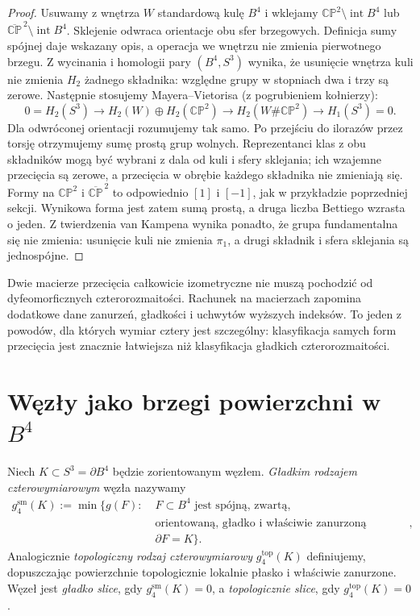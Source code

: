 \begin{proof}
Usuwamy z wnętrza $W$ standardową kulę $B^4$ i wklejamy
$\mathbb{CP}^2\setminus\operatorname{int}B^4$ lub
$\overline{\mathbb{CP}}^{\,2}\setminus\operatorname{int}B^4$.
Sklejenie odwraca orientacje obu sfer brzegowych.
Definicja sumy spójnej daje wskazany opis,
a operacja we wnętrzu nie zmienia pierwotnego brzegu.
Z wycinania i homologii pary $(B^4,S^3)$ wynika,
że usunięcie wnętrza kuli nie zmienia $H_2$
żadnego składnika: względne grupy w stopniach
dwa i trzy są zerowe. Następnie stosujemy
Mayera--Vietorisa (z pogrubieniem kołnierzy):
\[
0=H_2(S^3)\to H_2(W)\oplus H_2(\mathbb{CP}^2)
\to H_2(W\#\mathbb{CP}^2)\to H_1(S^3)=0.
\]
Dla odwróconej orientacji rozumujemy tak samo.
Po przejściu do ilorazów przez torsję otrzymujemy
sumę prostą grup wolnych. Reprezentanci klas
z obu składników mogą być wybrani z dala
od kuli i sfery sklejania; ich wzajemne
przecięcia są zerowe, a przecięcia w obrębie
każdego składnika nie zmieniają się. Formy
na $\mathbb{CP}^2$ i $\overline{\mathbb{CP}}^{\,2}$
to odpowiednio $[1]$ i $[-1]$, jak w przykładzie
poprzedniej sekcji. Wynikowa forma jest zatem
sumą prostą, a druga liczba Bettiego wzrasta
o jeden. Z twierdzenia van Kampena wynika
ponadto, że grupa fundamentalna się nie zmienia:
usunięcie kuli nie zmienia $\pi_1$, a drugi
składnik i sfera sklejania są jednospójne.
\end{proof}

\begin{uwaga}
Dwie macierze przecięcia całkowicie izometryczne nie muszą
pochodzić od dyfeomorficznych czterorozmaitości.
Rachunek na macierzach zapomina dodatkowe dane zanurzeń,
gładkości i uchwytów wyższych indeksów. To jeden z powodów,
dla których wymiar cztery jest szczególny: klasyfikacja
samych form przecięcia jest znacznie łatwiejsza niż
klasyfikacja gładkich czterorozmaitości.
\end{uwaga}

\section{Węzły jako brzegi powierzchni w \texorpdfstring{$B^4$}{B4}}
\label{sec:kt-slice}

\begin{definicja}
Niech $K\subset S^3=\partial B^4$ będzie zorientowanym węzłem.
\emph{Gładkim rodzajem czterowymiarowym} węzła nazywamy
\[
\begin{aligned}
g_4^{\mathrm{sm}}(K):=\min\big\{g(F):\;&F\subset B^4
\text{ jest spójną, zwartą,}\\
&\text{orientowaną, gładko i właściwie zanurzoną powierzchnią},\\
&\partial F=K\big\}.
\end{aligned}
\]
Analogicznie \emph{topologiczny rodzaj czterowymiarowy}
$g_4^{\mathrm{top}}(K)$ definiujemy, dopuszczając powierzchnie
topologicznie lokalnie płasko i właściwie zanurzone.
Węzeł jest \emph{gładko slice}, gdy $g_4^{\mathrm{sm}}(K)=0$,
a \emph{topologicznie slice}, gdy $g_4^{\mathrm{top}}(K)=0$.
\end{definicja}

